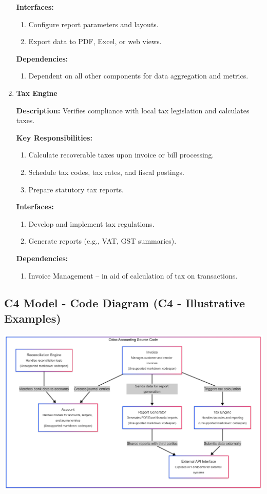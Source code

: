 \documentclass[11pt,a4paper]{article}
\begin{document}
\begin{enumerate}
    \textbf{Interfaces:}
    \begin{enumerate}
        \item Configure report parameters and layouts.
        \item Export data to PDF, Excel, or web views.
    \end{enumerate}

    \textbf{Dependencies:}
    \begin{enumerate}
        \item Dependent on all other components for data aggregation and metrics.
    \end{enumerate}

    \item \textbf{Tax Engine}
                
    \textbf{Description:} Verifies compliance with local tax legislation and calculates taxes.
    \medskip

    \textbf{Key Responsibilities:}
    \begin{enumerate}
        \item Calculate recoverable taxes upon invoice or bill processing.
        \item Schedule tax codes, tax rates, and fiscal postings.
        \item Prepare statutory tax reports.
    \end{enumerate}

    \textbf{Interfaces:}
    \begin{enumerate}
        \item Develop and implement tax regulations.
        \item Generate reports (e.g., VAT, GST summaries).
    \end{enumerate}

    \textbf{Dependencies:}
    \begin{enumerate}
        \item Invoice Management – in aid of calculation of tax on transactions.
    \end{enumerate}

\end{enumerate}

\subsection{C4 Model - Code Diagram (C4 - Illustrative Examples)}
\begin{center}
    \includegraphics[width=0.8\linewidth]{diagram/C4_model.png}
\end{center}
\end{document}
